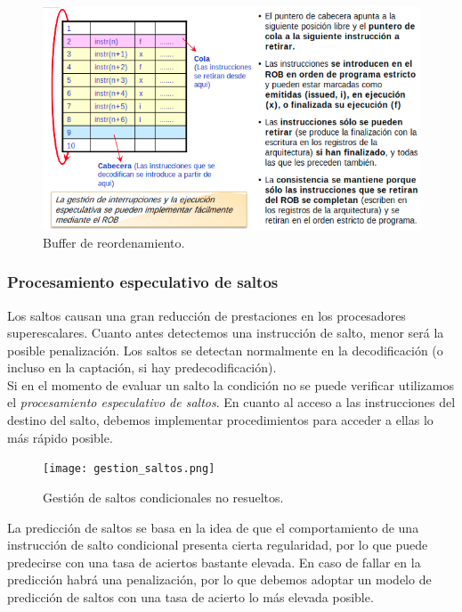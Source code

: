 \documentclass[12pt,spanish]{article}
\begin{document}
\begin{figure}[H]
\centering
\includegraphics[scale=0.75]{rob.png}
\caption{Buffer de reordenamiento.}
\end{figure}



\subsubsection{Procesamiento especulativo de saltos}

Los saltos causan una gran reducción de prestaciones en los procesadores superescalares. Cuanto antes detectemos una instrucción de salto, menor será la posible penalización. Los saltos se detectan normalmente en la decodificación (o incluso en la captación, si hay predecodificación).\\

Si en el momento de evaluar un salto la condición no se puede verificar utilizamos el \emph{procesamiento especulativo de saltos}. En cuanto al acceso a las instrucciones del destino del salto, debemos implementar procedimientos para acceder a ellas lo más rápido posible.
	

\begin{figure}[H]
\centering
\texttt{[image: gestion\_saltos.png]}
\caption{Gestión de saltos condicionales no resueltos.}
\end{figure}


La predicción de saltos se basa en la idea de que el comportamiento de una instrucción de salto condicional presenta cierta regularidad, por lo que puede predecirse con una tasa de aciertos bastante elevada. En caso de fallar en la predicción habrá una penalización, por lo que debemos adoptar un modelo de predicción de saltos con una tasa de acierto lo más elevada posible.\\
\end{document}
